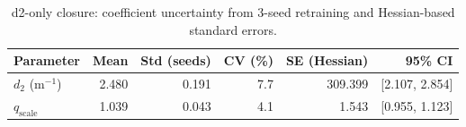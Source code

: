 \begin{table}[htbp]
  \centering
  \caption{d2-only closure: coefficient uncertainty from 3-seed
           retraining and Hessian-based standard errors.}
  \label{tab:coeff_uncertainty}
  \begin{tabular}{lrrrrr}
    \toprule
    Parameter & Mean & Std (seeds) & CV (\%) & SE (Hessian) & 95\% CI \\
    \midrule
    $d_2$ (m$^{-1}$) & 2.480 & 0.191 & 7.7 & 309.399 & [2.107, 2.854] \\
    $q_{\mathrm{scale}}$ & 1.039 & 0.043 & 4.1 & 1.543 & [0.955, 1.123] \\
    \bottomrule
  \end{tabular}
\end{table}